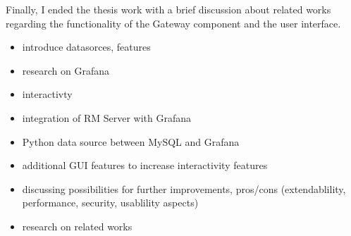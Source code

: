 Finally, I ended the thesis work with a brief discussion about related works regarding the functionality of the Gateway component and the user interface.

\begin{itemize}
	\item introduce datasorces, features
	\item research on Grafana
	\item interactivty
	\item integration of RM Server with Grafana
	\item Python data source between MySQL and Grafana
	\item additional GUI features to increase interactivity features
	\item discussing possibilities for further improvements, pros/cons (extendablility, performance, security, usablility aspects)
	\item research on related works
\end{itemize}

